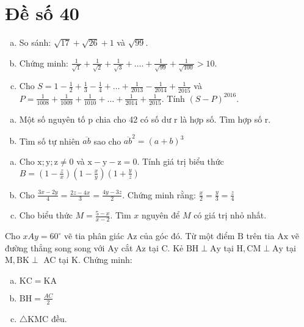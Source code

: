 \section{Đề số 40}

\begin{bt} 
	\hfill
	\begin{enumerate}[a.]
		\item So sánh: $\sqrt{17}+\sqrt{26}+1$ và $\sqrt{99}$.
		\item Chứng minh: $\frac{1}{\sqrt{1}}+\frac{1}{\sqrt{2}}+\frac{1}{\sqrt{3}}+\ldots .+\frac{1}{\sqrt{99}}+\frac{1}{\sqrt{100}}>10$.
		\item Cho $S=1-\frac{1}{2}+\frac{1}{3}-\frac{1}{4}+\ldots+\frac{1}{2013}-\frac{1}{2014}+\frac{1}{2015}$ và $P=\frac{1}{1008}+\frac{1}{1009}+\frac{1}{1010}+\ldots+\frac{1}{2014}+\frac{1}{2015}$.
		Tính $(S-P)^{2016}$.
	\end{enumerate}
	\loigiai{} 
\end{bt}

\begin{bt}
	\hfill
	\begin{enumerate}[a.]
		\item Một số nguyên tố $\mathrm{p}$ chia cho 42 có số dư $\mathrm{r}$ là hợp số. Tìm hợp số $\mathrm{r}$.
		\item Tìm số tự nhiên $\overline{a b}$ sao cho $\overline{a b}^2=(a+b)^3$
	\end{enumerate}
	\loigiai{} 
\end{bt}

\begin{bt}
	\hfill 
	\begin{enumerate}[a.]
		\item Cho $\mathrm{x} ; \mathrm{y} ; \mathrm{z} \neq 0$ và $\mathrm{x}-\mathrm{y}-\mathrm{z}=0$. Tính giá trị biểu thức $B=\left(1-\frac{z}{x}\right)\left(1-\frac{x}{y}\right)\left(1+\frac{y}{z}\right)$
		\item Cho $\frac{3 x-2 y}{4}=\frac{2 z-4 x}{3}=\frac{4 y-3 z}{2}$. Chứng minh rằng: $\frac{x}{2}=\frac{y}{3}=\frac{z}{4}$
		\item Cho biểu thức $M=\frac{5-x}{x-2}$. Tìm $x$ nguyên để $M$ có giá trị nhỏ nhất.
	\end{enumerate}
	\loigiai{} 
\end{bt}

\begin{bt}
	\hfill 
	Cho $x A y=60^{\circ}$ vẽ tia phân giác $\mathrm{Az}$ của góc đó. Từ một điểm $\mathrm{B}$ trên tia $\mathrm{Ax}$ vẽ đường thẳng song song với $\mathrm{Ay}$ cắt $\mathrm{Az}$ tại $\mathrm{C}$. Kẻ $\mathrm{BH} \perp \mathrm{Ay}$ tại $\mathrm{H}, \mathrm{CM} \perp \mathrm{Ay}$ tại $\mathrm{M}, \mathrm{BK} \perp$ AC tại K. Chứng minh:
	\begin{enumerate}[a.]
		\item $\mathrm{KC}=\mathrm{KA}$
		\item $\mathrm{BH}=\frac{A C}{2}$
		\item $\triangle \mathrm{KMC}$ đều.
	\end{enumerate}
	\loigiai{} 
\end{bt}

